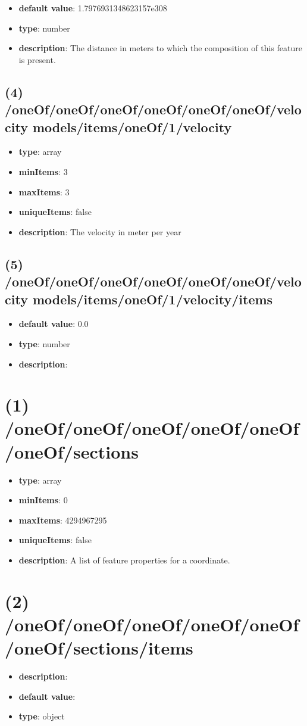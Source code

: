 \begin{itemize}[leftmargin=4em]\item {\bf default value}: 1.7976931348623157e308
\item {\bf type}: number
\item {\bf description}: The distance in meters to which the composition of this feature is present.
\end{itemize}\subsection{(4) /oneOf/oneOf/oneOf/oneOf/oneOf/oneOf/velocity models/items/oneOf/1/velocity}
\begin{itemize}[leftmargin=4em]\item {\bf type}: array
\item {\bf minItems}: 3
\item {\bf maxItems}: 3
\item {\bf uniqueItems}: false
\item {\bf description}: The velocity in meter per year
\end{itemize}\subsection{(5) /oneOf/oneOf/oneOf/oneOf/oneOf/oneOf/velocity models/items/oneOf/1/velocity/items}
\begin{itemize}[leftmargin=5em]\item {\bf default value}: 0.0
\item {\bf type}: number
\item {\bf description}: 
\end{itemize}\section{(1) /oneOf/oneOf/oneOf/oneOf/oneOf/oneOf/sections}
\begin{itemize}[leftmargin=1em]\item {\bf type}: array
\item {\bf minItems}: 0
\item {\bf maxItems}: 4294967295
\item {\bf uniqueItems}: false
\item {\bf description}: A list of feature properties for a coordinate.
\end{itemize}\section{(2) /oneOf/oneOf/oneOf/oneOf/oneOf/oneOf/sections/items}
\begin{itemize}[leftmargin=2em]\item {\bf description}: 
\item {\bf default value}: 
\item {\bf type}: object
\end{itemize}
